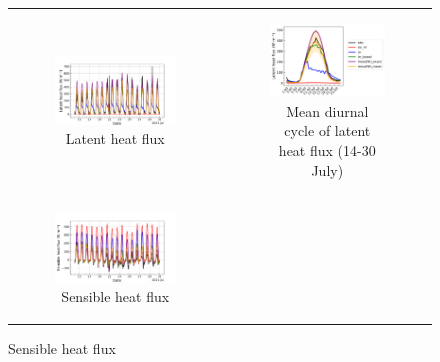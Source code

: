 \begin{figure}[t]
    \centering
    \begin{tabular}{cc}
        \begin{subfigure}[t]{0.5\textwidth}
            \caption{Latent heat flux}
            \includegraphics[width=\textwidth]{images/chap5/SOP_TS_DC/time_series_cendrosa_flat.png}
        \end{subfigure} &
        \begin{subfigure}[t]{0.5\textwidth}
            \caption{Mean diurnal cycle of latent heat flux (14-30 July)}
            \includegraphics[width=\textwidth]{images/chap5/SOP_TS_DC/diurnal_cycle_cendrosa_flat.png}
        \end{subfigure} \\
        \begin{subfigure}[t]{0.5\textwidth}
            \caption{Sensible heat flux}
            \includegraphics[width=\textwidth]{images/chap5/SOP_TS_DC/time_series_cendrosa_sens.png}

\end{subfigure}
\end{tabular}
\end{figure}
